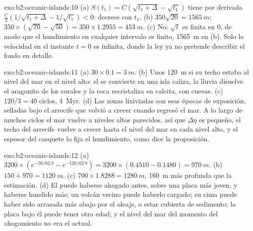 \begin{solution}{exo:b2:oceanic-islands:10}
(a) $S(t_1) = C(\sqrt{t_1 + \Delta} - \sqrt{t_1})$ tiene por derivada $\frac C2(1/\sqrt{t_1 +
\Delta} - 1/\sqrt{t_1}) < 0$: decrece con $t_1$. (b) $350\sqrt{20} = \qty{1565}{m}$; $350\times
(\sqrt{70} - \sqrt{50}) = 350\times1.2955 = \qty{453}{m}$. (c) No: $\sqrt t$ es finita en $0$, de modo que
el hundimiento en cualquier intervalo es finito, \qty{1565}{m} en (b). Solo la velocidad en el instante $t = 0$
es infinita, donde la ley ya no pretende describir el fondo en detalle.
\end{solution}

\begin{solution}{exo:b2:oceanic-islands:11}
(a) $30\times0.1 = \qty{3}{m}$. (b) Unos \qty{120}{m} si su techo estaba al nivel del mar en el
nivel alto: el  se convierte en una isla caliza, la lluvia disuelve el aragonito de los corales y la
roca recristaliza en calcita, con cuevas. (c) $120/3 = 40$ ciclos, \qty{4}{Myr}. (d) Las zonas lixiviadas
son esas épocas de exposición, selladas bajo el arrecife que volvió a crecer cuando regresó el mar.
A lo largo de muchos ciclos el mar vuelve a niveles altos parecidos, así que $\Delta\eta$ es pequeño, el techo del arrecife
vuelve a crecer hasta el nivel del mar en cada nivel alto, y el espesor del casquete lo fija el hundimiento, como
dice la proposición.
\end{solution}

\begin{solution}{exo:b2:oceanic-islands:12}
(a) $3200\times(e^{-50/62.8} - e^{-120/62.8}) = 3200\times(0.4510 - 0.1480) = \qty{970}{m}$.
(b) $150 + 970 = \qty{1120}{m}$. (c) $700\times1.8288 = \qty{1280}{m}$, \qty{160}{m} más profunda que la
estimación. (d) El  puede haberse ahogado antes, sobre una placa más joven, y haberse hundido más; un volcán
vecino puede haberlo cargado; su cima puede haber sido arrasada más abajo por el oleaje, o estar cubierta de sedimento; la
placa bajo él puede tener otra edad; y el nivel del mar del momento del ahogamiento no era
el actual.
\end{solution}

